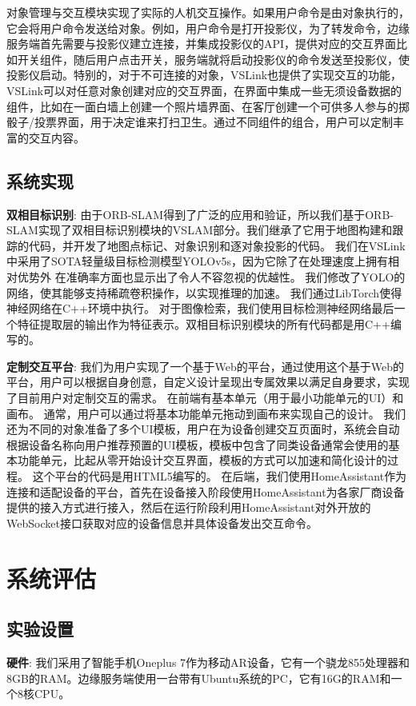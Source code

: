对象管理与交互模块实现了实际的人机交互操作。如果用户命令是由对象执行的，它会将用户命令发送给对象。例如，用户命令是打开投影仪，为了转发命令，边缘服务端首先需要与投影仪建立连接，并集成投影仪的API，提供对应的交互界面比如开关组件，随后用户点击开关，服务端就将启动投影仪的命令发送至投影仪，使投影仪启动。特别的，对于不可连接的对象，VSLink也提供了实现交互的功能，VSLink可以对任意对象创建对应的交互界面，在界面中集成一些无须设备数据的组件，比如在一面白墙上创建一个照片墙界面、在客厅创建一个可供多人参与的掷骰子/投票界面，用于决定谁来打扫卫生。通过不同组件的组合，用户可以定制丰富的交互内容。
\subsection{系统实现}
\textbf{双相目标识别}: 由于ORB-SLAM得到了广泛的应用和验证，所以我们基于ORB-SLAM\cite{CamElvRod20}实现了双相目标识别模块的VSLAM部分。我们继承了它用于地图构建和跟踪的代码，并开发了地图点标记、对象识别和逐对象投影的代码。
我们在VSLink中采用了SOTA轻量级目标检测模型YOLOv5s\cite{glenn_jocher_2020_4154370}，因为它除了在处理速度上拥有相对优势外 在准确率方面也显示出了令人不容忽视的优越性。
我们修改了YOLO的网络，使其能够支持稀疏卷积操作\cite{ren2018sbnet}，以实现推理的加速。
我们通过LibTorch使得神经网络在C++环境中执行。
对于图像检索，我们使用目标检测神经网络最后一个特征提取层的输出\cite{glenn_jocher_2020_4154370}作为特征表示。双相目标识别模块的所有代码都是用C++编写的。

\textbf{定制交互平台}: 我们为用户实现了一个基于Web的平台，通过使用这个基于Web的平台，用户可以根据自身创意，自定义设计呈现出专属效果以满足自身要求，实现了目前用户对定制交互的需求。
在前端有基本单元（用于最小功能单元的UI）和画布。
通常，用户可以通过将基本功能单元拖动到画布来实现自己的设计。
我们还为不同的对象准备了多个UI模板，用户在为设备创建交互页面时，系统会自动根据设备名称向用户推荐预置的UI模板，模板中包含了同类设备通常会使用的基本功能单元，比起从零开始设计交互界面，模板的方式可以加速和简化设计的过程。
这个平台的代码是用HTML5编写的。
在后端，我们使用HomeAssistant\cite{homeass}作为连接和适配设备的平台，首先在设备接入阶段使用HomeAssistant为各家厂商设备提供的接入方式进行接入，然后在运行阶段利用HomeAssistant对外开放的WebSocket接口获取对应的设备信息并具体设备发出交互命令。
\section{系统评估}
\subsection{实验设置}
\textbf{硬件}: 我们采用了智能手机Oneplus 7作为移动AR设备，它有一个骁龙855处理器和8GB的RAM。边缘服务端使用一台带有Ubuntu系统的PC，它有16G的RAM和一个8核CPU。


